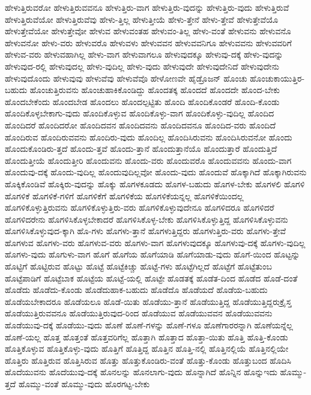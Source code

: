 {ಹೇಳುತ್ತಿರುವರೋ
ಹೇಳುತ್ತಿರುವವನೂ
ಹೇಳುತ್ತಿರು-ವಾಗ
ಹೇಳುತ್ತಿರು-ವುದನ್ನು
ಹೇಳುತ್ತಿರು-ವುದು
ಹೇಳುತ್ತಿರುವೆ
ಹೇಳುತ್ತಿರುವೆಯೋ
ಹೇಳುತ್ತಿರುವೆವು
ಹೇಳು-ತ್ತಿಲ್ಲ
ಹೇಳುತ್ತೀಯೆ
ಹೇಳು-ತ್ತೇನೆ
ಹೇಳು-ತ್ತೇವೆ
ಹೇಳುತ್ತೇವೆಯೊ
ಹೇಳುತ್ತೇವೆಯೋ
ಹೇಳುತ್ತೇವೋ
ಹೇಳುವ
ಹೇಳುವಂತಹ
ಹೇಳುವಂ-ತಿಲ್ಲ
ಹೇಳು-ವಂತೆ
ಹೇಳುವನು
ಹೇಳುವನೊ
ಹೇಳುವನೋ
ಹೇಳು-ವರು
ಹೇಳುವರೊ
ಹೇಳುವಳು
ಹೇಳುವವನ
ಹೇಳುವವನಿಗೂ
ಹೇಳುವವನು
ಹೇಳುವವರಿಗೆ
ಹೇಳುವ-ವರು
ಹೇಳುವಹಾಗಿಲ್ಲ
ಹೇಳು-ವಾಗ
ಹೇಳುವಾಗಲೂ
ಹೇಳುವುದಕ್ಕೂ
ಹೇಳುವು-ದಕ್ಕೆ
ಹೇಳು-ವುದನ್ನು
ಹೇಳುವುದ-ರಲ್ಲಿ
ಹೇಳುವುದಲ್ಲ
ಹೇಳು-ವುದಿಲ್ಲ
ಹೇಳು-ವುದು
ಹೇಳುವುದೇ
ಹೇಳುವುದೇನಿದೆ
ಹೇಳುವುದೇನು
ಹೇಳುವುದೊಂದು
ಹೇಳುವುವು
ಹೇಳುವೆವು
ಹೇಳುವೆವೊ
ಹೇಳೋಣವೇ
ಹೈಡ್ರೊಜನ್
ಹೊಂಚು
ಹೊಂಚುಕಾಯುತ್ತಿರ-ಬಹುದು
ಹೊಂಚುತ್ತಿರುವನು
ಹೊಂಚುಹಾಕಿಕೊಂಡಿದ್ದು
ಹೊಂದತಕ್ಕ
ಹೊಂದದೆ
ಹೊಂದದೇ
ಹೊಂದ-ಬೇಕು
ಹೊಂದಬೇಕೆಂದು
ಹೊಂದಬೇಡ
ಹೊಂದಲು
ಹೊಂದಲ್ಪಟ್ಟಿತು
ಹೊಂದಿ
ಹೊಂದಿಕೊಂಡರೆ
ಹೊಂದಿ-ಕೊಂಡು
ಹೊಂದಿಕೊಳ್ಳಬೇಕಾಗು-ವುದು
ಹೊಂದಿಕೊಳ್ಳುವ
ಹೊಂದಿಕೊಳ್ಳು-ವಾಗ
ಹೊಂದಿಕೊಳ್ಳು-ವುದಿಲ್ಲ
ಹೊಂದಿದ
ಹೊಂದಿದರೆ
ಹೊಂದಿದರೋ
ಹೊಂದಿದವನ
ಹೊಂದಿದವನು
ಹೊಂದಿದವನೂ
ಹೊಂದಿದ-ವರು
ಹೊಂದಿದೆ
ಹೊಂದಿರುವ
ಹೊಂದಿರುವವನು
ಹೊಂದಿರು-ವುದು
ಹೊಂದಿಲ್ಲ
ಹೊಂದಿಸಿರುವನು
ಹೊಂದಿಸಿರುವನೋ
ಹೊಂದು
ಹೊಂದುಕೊಂಡಿರು-ತ್ತದೆ
ಹೊಂದು-ತ್ತವೆ
ಹೊಂದು-ತ್ತಾನೆ
ಹೊಂದುತ್ತಾನೆಯೊ
ಹೊಂದುತ್ತಾರೆ
ಹೊಂದುತ್ತಿದೆ
ಹೊಂದುತ್ತೀಯೆ
ಹೊಂದುತ್ತೀರಿ
ಹೊಂದುವನು
ಹೊಂದು-ವರು
ಹೊಂದುವರೊ
ಹೊಂದುವವನು
ಹೊಂದು-ವಾಗ
ಹೊಂದುವು-ದಕ್ಕೆ
ಹೊಂದು-ವುದಿಲ್ಲ
ಹೊಂದುವುದಿಲ್ಲವೋ
ಹೊಂದು-ವುದು
ಹೊಂದುವೆ
ಹೊಕ್ಕಾಗಿದೆ
ಹೊಕ್ಕಾಗಿರುವನು
ಹೊಕ್ಕಿಕೊಂಡಿವೆ
ಹೊಕ್ಕಿರು-ವುದನ್ನು
ಹೊಕ್ಕು
ಹೊಗಳಕೂಡದು
ಹೊಗಳ-ಬಹುದು
ಹೊಗಳ-ಬೇಕು
ಹೊಗಳಲಿ
ಹೊಗಳಿ
ಹೊಗಳಿಕೆ
ಹೊಗಳಿಕೆ-ಗಳಿಗೆ
ಹೊಗಳಿಕೆಗೆ
ಹೊಗಳಿಕೆಯ
ಹೊಗಳಿಕೆಯನ್ನಲ್ಲ
ಹೊಗಳಿಕೆಯಿಂದಲ್ಲ
ಹೊಗಳಿಕೊಳ್ಳುತ್ತಿರುವನು
ಹೊಗಳಿಕೊಳ್ಳುತ್ತಿರು-ವರು
ಹೊಗಳಿಕೊಳ್ಳುವುದೇನೂ
ಹೊಗಳಿದರೂ
ಹೊಗಳಿದರೆ
ಹೊಗಳಿದರೇನು
ಹೊಗಳಿಸಿಕೊಳ್ಳಬೇಕಾದರೆ
ಹೊಗಳಿಸಿಕೊಳ್ಳ-ಬೇಕು
ಹೊಗಳಿಸಿಕೊಳ್ಳುತ್ತಿದ್ದ
ಹೊಗಳಿಸಿಕೊಳ್ಳುವನು
ಹೊಗಳಿಸಿಕೊಳ್ಳುವುದ-ಕ್ಕಾಗಿ
ಹೊ-ಗಳು
ಹೊಗಳು-ತ್ತಾನೆ
ಹೊಗಳುತ್ತಿದ್ದರು
ಹೊಗಳುತ್ತಿರು-ವರು
ಹೊಗಳು-ತ್ತೇವೆ
ಹೊಗಳುವ
ಹೊಗಳು-ವರು
ಹೊಗಳುವ-ವರು
ಹೊಗಳು-ವಾಗ
ಹೊಗಳುವುದಕ್ಕೂ
ಹೊಗಳುವು-ದಕ್ಕೆ
ಹೊಗಳು-ವುದಿಲ್ಲ
ಹೊಗಳು-ವುದು
ಹೊಗುಳು-ವಾಗ
ಹೊಗೆ
ಹೊಗೆಯ
ಹೊಗೆಯಾಡಿ
ಹೊಗೆಯಾಡು-ವುದು
ಹೊಗೆ-ಯಿಂದ
ಹೊಟ್ಟನ್ನು
ಹೊಟ್ಟಿಗೆ
ಹೊಟ್ಟಿರುವ
ಹೊಟ್ಟು
ಹೊಟ್ಟೆ
ಹೊಟ್ಟೆಕಿಚ್ಚು
ಹೊಟ್ಟೆ-ಗಳು
ಹೊಟ್ಟೆಗಿಲ್ಲದೆ
ಹೊಟ್ಟೆಗೆ
ಹೊಟ್ಟೆತುಂಬ
ಹೊಟ್ಟೆಪಾಡಿಗೆ
ಹೊಟ್ಟೆಬಾಕ
ಹೊಟ್ಟೆಯ
ಹೊಟ್ಟೆ-ಯಲ್ಲಿ
ಹೊಟ್ಟೇ
ಹೊಡತಕ್ಕೆ
ಹೊಡೆತ-ದಿಂದ
ಹೊಡೆದ
ಹೊಡೆ-ದಂತೆ
ಹೊಡೆದು
ಹೊಡೆದು-ಕೊಂಡು
ಹೊಡೆದುಹಾಕ-ಬಹುದು
ಹೊಡೆದೊ
ಹೊಡೆಯದೆ
ಹೊಡೆಯ-ಬಹುದು
ಹೊಡೆಯಬೇಕಾದರೂ
ಹೊಡೆಯಲೂ
ಹೊಡೆ-ಯಿತು
ಹೊಡೆಯು-ತ್ತಾನೆ
ಹೊಡೆಯುತ್ತಿದ್ದ
ಹೊಡೆಯುತ್ತಿದ್ದರುಕ್ರೈಸ್ತ
ಹೊಡೆಯುತ್ತಿರುವವನೂ
ಹೊಡೆಯುತ್ತಿರುವುದ-ರಿಂದ
ಹೊಡೆಯುವ
ಹೊಡೆಯುವವನ
ಹೊಡೆಯುವವನು
ಹೊಡೆಯುವು-ದಕ್ಕೆ
ಹೊಡೆಯು-ವುದು
ಹೊಣೆ
ಹೊಣೆ-ಗಳನ್ನು
ಹೊಣೆ-ಗಳೂ
ಹೊಣೆಗಾರರನ್ನಾಗಿ
ಹೊಣೆಯನ್ನೆಲ್ಲ
ಹೊಣೆ-ಯಲ್ಲ
ಹೊತ್ತ
ಹೊತ್ತಂತೆ
ಹೊತ್ತವರಿಗೆಲ್ಲ
ಹೊತ್ತಾಗಿ
ಹೊತ್ತಾದ
ಹೊತ್ತಾ-ಯಿತು
ಹೊತ್ತಿ
ಹೊತ್ತಿ-ಕೊಂಡು
ಹೊತ್ತಿಕೊಳ್ಳುವ
ಹೊತ್ತಿಕೊಳ್ಳು-ವುದು
ಹೊತ್ತಿಗೆ
ಹೊತ್ತಿದ್ದ
ಹೊತ್ತಿನ
ಹೊತ್ತಿ-ನಲ್ಲಿ
ಹೊತ್ತಿನಲ್ಲಿಯೆ
ಹೊತ್ತಿನಲ್ಲಿಯೇ
ಹೊತ್ತಿರು
ಹೊತ್ತಿರುವ
ಹೊತ್ತಿಸಿರುವ
ಹೊತ್ತು
ಹೊತ್ತುಕೊಂಡಿರು-ವಂತೆ
ಹೊತ್ತು-ಕೊಂಡು
ಹೊತ್ತುಬಂದ
ಹೊದಿಸಿ
ಹೊದೆಯುವನು
ಹೊದೆಯುವು-ದಕ್ಕೆ
ಹೊನಲನ್ನು
ಹೊನಲಾಗು-ವುದು
ಹೊನ್ನಾಗಿದೆ
ಹೊನ್ನಿನ
ಹೊನ್ನುಇದು
ಹೊಮ್ಮು-ತ್ತದೆ
ಹೊಮ್ಮು-ವಂತೆ
ಹೊಮ್ಮು-ವುದು
ಹೊರಗಟ್ಟ-ಬೇಕು
}
